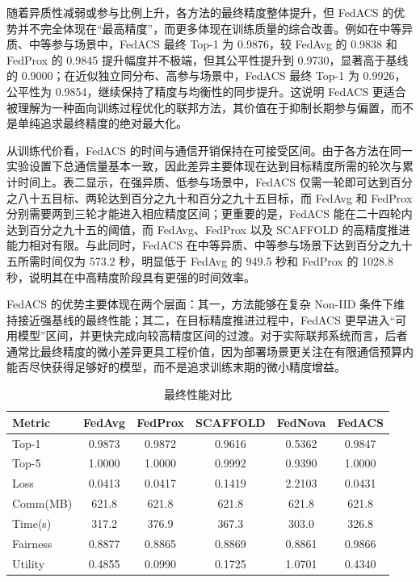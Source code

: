 \documentclass[UTF8,11pt]{ctexart}
\begin{document}
随着异质性减弱或参与比例上升，各方法的最终精度整体提升，但 FedACS 的优势并不完全体现在“最高精度”，而更多体现在训练质量的综合改善。例如在中等异质、中等参与场景中，FedACS 最终 Top-1 为 0.9876，较 FedAvg 的 0.9838 和 FedProx 的 0.9845 提升幅度并不极端，但其公平性提升到 0.9730，显著高于基线的 0.9000；在近似独立同分布、高参与场景中，FedACS 最终 Top-1 为 0.9926，公平性为 0.9854，继续保持了精度与均衡性的同步提升。这说明 FedACS 更适合被理解为一种面向训练过程优化的联邦方法，其价值在于抑制长期参与偏置，而不是单纯追求最终精度的绝对最大化。

从训练代价看，FedACS 的时间与通信开销保持在可接受区间。由于各方法在同一实验设置下总通信量基本一致，因此差异主要体现在达到目标精度所需的轮次与累计时间上。表二显示，在强异质、低参与场景中，FedACS 仅需一轮即可达到百分之八十五目标、两轮达到百分之九十和百分之九十五目标，而 FedAvg 和 FedProx 分别需要两到三轮才能进入相应精度区间；更重要的是，FedACS 能在二十四轮内达到百分之九十五的阈值，而 FedAvg、FedProx 以及 SCAFFOLD 的高精度推进能力相对有限。与此同时，FedACS 在中等异质、中等参与场景下达到百分之九十五所需时间仅为 573.2 秒，明显低于 FedAvg 的 949.5 秒和 FedProx 的 1028.8 秒，说明其在中高精度阶段具有更强的时间效率。

FedACS 的优势主要体现在两个层面：其一，方法能够在复杂 Non-IID 条件下维持接近强基线的最终性能；其二，在目标精度推进过程中，FedACS 更早进入“可用模型”区间，并更快完成向较高精度区间的过渡。对于实际联邦系统而言，后者通常比最终精度的微小差异更具工程价值，因为部署场景更关注在有限通信预算内能否尽快获得足够好的模型，而不是追求训练末期的微小精度增益。

\begin{table}[H]
\centering
\caption{最终性能对比}
\label{tab:main_overview_transposed}
\small
\setlength{\tabcolsep}{4pt}
\begin{tabular}{lccccc}
\toprule
Metric & FedAvg & FedProx & SCAFFOLD & FedNova & FedACS \\
\midrule
Top-1    & 0.9873 & 0.9872 & 0.9616 & 0.5362 & 0.9847 \\
Top-5    & 1.0000 & 1.0000 & 0.9992 & 0.9390 & 1.0000 \\
Loss     & 0.0413 & 0.0417 & 0.1419 & 2.2103 & 0.0431 \\
Comm(MB) & 621.8 & 621.8 & 621.8 & 621.8 & 621.8 \\
Time(s)  & 317.2 & 376.9 & 367.3 & 303.0 & 326.8 \\
Fairness & 0.8877 & 0.8865 & 0.8869 & 0.8861 & 0.9866 \\
Utility  & 0.4855 & 0.0990 & 0.1725 & 1.0701 & 0.4340 \\
\bottomrule
\end{tabular}
\end{table}
\end{document}
